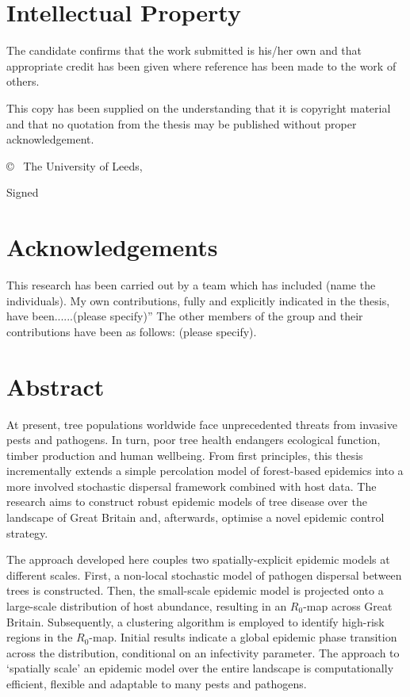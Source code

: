 \chapter*{Intellectual Property}
The candidate confirms that the work submitted is his/her own and that appropriate credit has been given where reference has been made to the work of others.

This copy has been supplied on the understanding that it is copyright material and that no quotation from the thesis may be published without proper acknowledgement.

© \submissionyear\ The University of Leeds, \name

\vspace{2cm}
Signed 

\chapter*{Acknowledgements}
This research has been carried out by a team which has included (name the individuals). My own contributions, fully and explicitly indicated in the thesis, have been......(please specify)” The other members of the group and their contributions have been as follows: (please specify).

\chapter*{Abstract}

At present, tree populations worldwide face unprecedented threats from invasive pests and pathogens. In turn, poor tree health endangers ecological function, timber production and human wellbeing. 
From first principles, this thesis incrementally extends a simple percolation model of forest-based epidemics into a more involved stochastic dispersal framework combined with host data. 
The research aims to construct robust epidemic models of tree disease over the landscape of Great Britain and, afterwards, optimise a novel epidemic control strategy.

The approach developed here couples two spatially-explicit epidemic models at different scales. 
First, a non-local stochastic model of pathogen dispersal between trees is constructed. 
Then, the small-scale epidemic model is projected onto a large-scale distribution of host abundance, resulting in an $R_0$-map across Great Britain. 
Subsequently, a clustering algorithm is employed to identify high-risk regions in the $R_0$-map. 
Initial results indicate a global epidemic phase transition across the distribution, conditional on an infectivity parameter.
The approach to `spatially scale' an epidemic model over the entire landscape is computationally efficient, flexible and adaptable to many pests and pathogens. 

